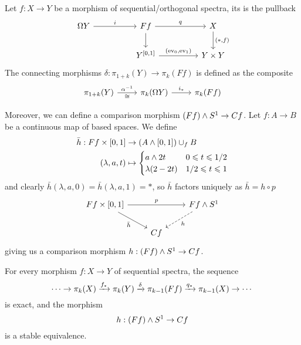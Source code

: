 \begin{construction}
Let $f:X\to Y$ be a morphism of sequential/orthogonal spectra, its  is the pullback
\[
\begin{tikzcd}[column sep=huge]
\Omega Y \ar[r,"i"] & Ff \ar[d] \ar[r,"q"] & X \ar[d,"{(*,f)}"]\\
 & Y^{[0,1]} \ar[r,"{(\ev_0,\ev_1)}"] & Y\times Y
\end{tikzcd}
\]
The connecting morphisms $\delta:\pi_{1+k}(Y)\to\pi_k(Ff)$ is defined as the composite
\[
\begin{tikzcd}
\pi_{1+k}(Y) \ar[r,"\alpha^\inv","\cong"'] & \pi_{k}(\Omega Y) \ar[r,"i_*"] & \pi_k(Ff)
\end{tikzcd}
\]

Moreover, we can define a comparison morphism $(Ff)\wedge S^1\to Cf$. Let $f:A\to B$ be a continuous map of based spaces. We define
\begin{align*}
\bar h:Ff\times[0,1]&\to(A\wedge[0,1])\cup_f B\\
(\lambda,a,t)&\mapsto\begin{cases}
a\wedge 2t & 0\leqslant t\leqslant 1/2\\
\lambda(2-2t) & 1/2\leqslant t\leqslant1
\end{cases}
\end{align*}
and clearly $\bar h(\lambda,a,0)=\bar h(\lambda,a,1)=*$, so $\bar h$ factors uniquely as $\bar h=h\circ p$
\[
\begin{tikzcd}
Ff\times[0,1] \ar[dr,"\bar h"'] \ar[rr,"p"] & & Ff\smsh S^1 \ar[dl,dashed,"h"]\\
 & Cf & 
\end{tikzcd}
\]
giving us a comparison morphism $h:(Ff)\wedge S^1\to Cf$.
\end{construction}

\begin{proposition}
For every morphism $f:X\to Y$ of sequential spectra, the sequence
\[\cdots\to\pi_k(X)\xrightarrow{f_*}\pi_k(Y)\xrightarrow{\delta}\pi_{k-1}(Ff)\xrightarrow{q_*}\pi_{k-1}(X)\to\cdots\]
is exact, and the morphism
\[h:(Ff)\wedge S^1\to Cf\]
is a stable equivalence.
\end{proposition}


